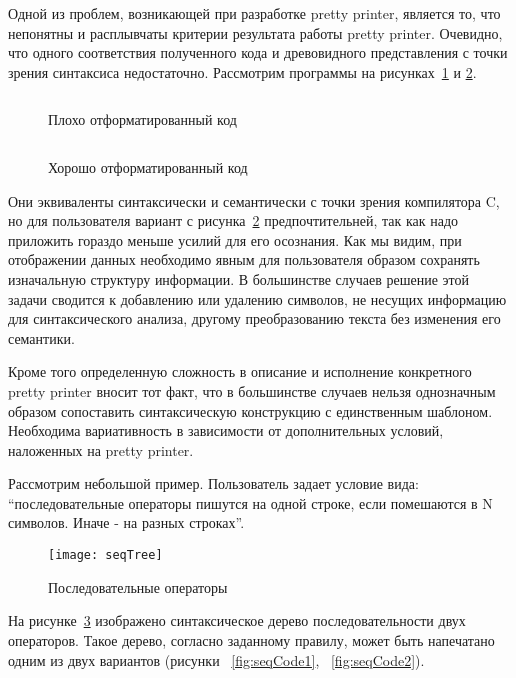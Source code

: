Одной из проблем, возникающей при разработке pretty printer, является то, что непонятны и расплывчаты критерии результата работы pretty printer.
Очевидно, что одного соответствия полученного кода и древовидного представления с точки зрения синтаксиса недостаточно. Рассмотрим программы на рисунках~\ref{fig:wikiExUnfor} и \ref{fig:wikiExBSD}.

\begin{figure}[h!]
	\centering
	\inputminted{c}{codes/wikiExUnfor.c}
	\caption{Плохо отформатированный код}
	\label{fig:wikiExUnfor}
\end{figure}

\begin{figure}[h!]
	\centering
	\inputminted{c}{codes/wikiExBSD.c}
	\caption{Хорошо отформатированный код}
	\label{fig:wikiExBSD}
\end{figure}

Они эквиваленты синтаксически и семантически с точки зрения компилятора C, но для пользователя вариант с рисунка~\ref{fig:wikiExBSD} предпочтительней, так как надо приложить гораздо меньше усилий для его осознания. Как мы видим, при отображении данных необходимо явным для пользователя образом сохранять изначальную структуру информации. В большинстве случаев решение этой задачи сводится к добавлению или удалению символов, не несущих информацию для синтаксического анализа, другому преобразованию текста без изменения его семантики.

Кроме того определенную сложность в описание и исполнение конкретного pretty printer вносит тот факт, что в большинстве случаев нельзя однозначным образом сопоставить синтаксическую конструкцию с единственным шаблоном. Необходима вариативность в зависимости от дополнительных условий, наложенных на pretty printer.

Рассмотрим небольшой пример. Пользователь задает условие вида: “последовательные операторы пишутся на одной строке, если помешаются в N символов. Иначе - на разных строках”.

\begin{figure}[h]
	\centering
	\texttt{[image: seqTree]}
	\caption{Последовательные операторы}
	\label{fig:seqImage}
\end{figure}

На рисунке~\ref{fig:seqImage} изображено синтаксическое дерево последовательности двух операторов. Такое дерево, согласно заданному правилу, может быть напечатано одним из двух вариантов (рисунки ~\ref{fig:seqCode1}, ~\ref{fig:seqCode2}).

